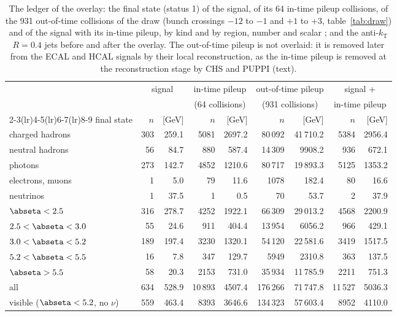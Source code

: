 \begin{table}[!tb]
\centering\footnotesize\setlength{\tabcolsep}{3.5pt}
\caption{The ledger of the overlay: the final state (status 1) of the signal, of its 64 in-time pileup collisions,
of the 931 out-of-time collisions of the draw (bunch crossings $-12$ to $-1$ and $+1$ to $+3$,
table~\ref{tab:draw}) and of the signal with its in-time pileup, by kind and by region, number and scalar \pt{}; and
the anti-$k_{\mathrm{T}}$ $R=0.4$ jets before and after the overlay. The out-of-time pileup is not overlaid: it is
removed later from the ECAL and HCAL signals by their local reconstruction, as the in-time pileup is removed at the
reconstruction stage by CHS and PUPPI (text).}
\label{tab:ledger}
\begin{tabular}{lrrrrrrrr}
\toprule
 & \multicolumn{2}{c}{signal} & \multicolumn{2}{c}{in-time pileup} & \multicolumn{2}{c}{out-of-time pileup} & \multicolumn{2}{c}{signal +} \\
 & \multicolumn{2}{c}{} & \multicolumn{2}{c}{(64 collisions)} & \multicolumn{2}{c}{(931 collisions)} & \multicolumn{2}{c}{in-time pileup} \\
\cmidrule(lr){2-3}\cmidrule(lr){4-5}\cmidrule(lr){6-7}\cmidrule(lr){8-9}
final state & $n$ & \pt{} [GeV] & $n$ & \pt{} [GeV] & $n$ & \pt{} [GeV] & $n$ & \pt{} [GeV] \\
\midrule
charged hadrons & 303 & 259.1 & 5081 & 2697.2 & 80\,092 & 41\,710.2 & 5384 & 2956.4 \\
neutral hadrons & 56 & 84.7 & 880 & 587.4 & 14\,309 & 9908.2 & 936 & 672.1 \\
photons & 273 & 142.7 & 4852 & 1210.6 & 80\,717 & 19\,893.3 & 5125 & 1353.2 \\
electrons, muons & 1 & 5.0 & 79 & 11.6 & 1078 & 182.4 & 80 & 16.6 \\
neutrinos & 1 & 37.5 & 1 & 0.5 & 70 & 53.7 & 2 & 37.9 \\
\midrule
$\abseta<2.5$ & 316 & 278.7 & 4252 & 1922.1 & 66\,309 & 29\,013.2 & 4568 & 2200.9 \\
$2.5<\abseta<3.0$ & 55 & 24.6 & 911 & 404.4 & 13\,954 & 6056.2 & 966 & 429.1 \\
$3.0<\abseta<5.2$ & 189 & 197.4 & 3230 & 1320.1 & 54\,120 & 22\,581.6 & 3419 & 1517.5 \\
$5.2<\abseta<5.5$ & 16 & 7.8 & 347 & 129.7 & 5949 & 2310.8 & 363 & 137.5 \\
$\abseta>5.5$ & 58 & 20.3 & 2153 & 731.0 & 35\,934 & 11\,785.9 & 2211 & 751.3 \\
\midrule
all & 634 & 528.9 & 10\,893 & 4507.4 & 176\,266 & 71\,747.8 & 11\,527 & 5036.3 \\
visible ($\abseta<5.2$, no $\nu$) & 559 & 463.4 & 8393 & 3646.6 & 134\,323 & 57\,603.4 & 8952 & 4110.0 \\
\bottomrule
\end{tabular}


\end{table}
